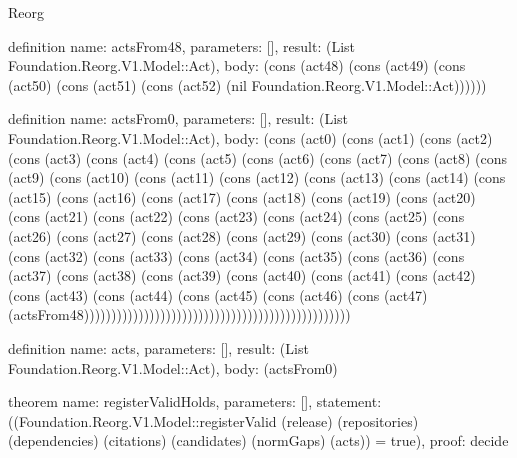 \begin{lexlean}{Reorg}
\begin{semanticmodule}
definition{
  name: actsFrom48,
  parameters: [],
  result: (List Foundation.Reorg.V1.Model::Act),
  body: (cons (act48) (cons (act49) (cons (act50) (cons (act51) (cons (act52) (nil Foundation.Reorg.V1.Model::Act))))))
}

definition{
  name: actsFrom0,
  parameters: [],
  result: (List Foundation.Reorg.V1.Model::Act),
  body: (cons (act0) (cons (act1) (cons (act2) (cons (act3) (cons (act4) (cons (act5) (cons (act6) (cons (act7) (cons (act8) (cons (act9) (cons (act10) (cons (act11) (cons (act12) (cons (act13) (cons (act14) (cons (act15) (cons (act16) (cons (act17) (cons (act18) (cons (act19) (cons (act20) (cons (act21) (cons (act22) (cons (act23) (cons (act24) (cons (act25) (cons (act26) (cons (act27) (cons (act28) (cons (act29) (cons (act30) (cons (act31) (cons (act32) (cons (act33) (cons (act34) (cons (act35) (cons (act36) (cons (act37) (cons (act38) (cons (act39) (cons (act40) (cons (act41) (cons (act42) (cons (act43) (cons (act44) (cons (act45) (cons (act46) (cons (act47) (actsFrom48)))))))))))))))))))))))))))))))))))))))))))))))))
}

definition{
  name: acts,
  parameters: [],
  result: (List Foundation.Reorg.V1.Model::Act),
  body: (actsFrom0)
}

theorem{
  name: registerValidHolds,
  parameters: [],
  statement: ((Foundation.Reorg.V1.Model::registerValid (release) (repositories) (dependencies) (citations) (candidates) (normGaps) (acts)) = true),
  proof: decide{}
}
\end{semanticmodule}
\end{lexlean}
